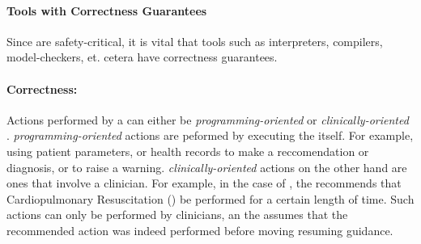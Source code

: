 %

\paragraph{Tools with Correctness Guarantees}

Since \CIGs{} are safety-critical, it is vital that tools
such as interpreters, compilers, model-checkers, et. cetera
have correctness guarantees.

\paragraph{Correctness:}

Actions performed by a \CDSS{} can either be \emph{programming-oriented}
or \emph{clinically-oriented} \cite{BoxwalaJBI04}. \emph{programming-oriented}
actions are peformed by executing the \CIG{} itself. For example,
using patient parameters, or health records to make a reccomendation or diagnosis,
or to raise a warning. \emph{clinically-oriented} actions on the other hand
are ones that involve a clinician. For example, in the case of \ACLS{},
the \CDSS{} recommends that Cardiopulmonary Resuscitation (\CPR{}) be performed
for a certain length of time. Such actions can only be performed by clinicians,
an the \CDSS{} assumes that the recommended action was indeed performed before
moving resuming guidance.

